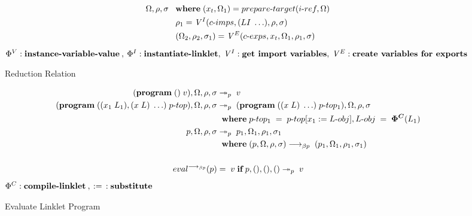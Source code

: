 \documentclass[sigplan,screen,anonymous]{acmart}
\def\dash {\text{-}}
\begin{document}
\begin{figure}[tbp]
\begin{align*}
    \Omega, \rho, \sigma\; &\;\; \where (x_t, \Omega_1) = prepare\dash target(i\dash ref, \Omega) \\
    \;          &\;\; \rho_1 = \mathit{V}^I(c\dash imps, (LI\; \ldots), \rho, \sigma) \\
    \;          &\;\; (\Omega_2, \rho_2, \sigma_1) = \mathit{V}^E(c\dash exps, x_t, \Omega_1, \rho_1, \sigma) \\
  \end{align*}
  \hfill \footnotesize $\Phi^V : \textbf{instance\dash variable\dash value}\:,\: \Phi^I : \textbf{instantiate\dash linklet},\: \mathit{V}^I : \textbf{get  import variables},\: \mathit{V}^E : \textbf{create variables for exports}$
\caption{Reduction Relation}
\label{fig:reduction}
\end{figure}

\newcommand{\runio}[1]{run\dash prog(#1, \Omega, \rho, \sigma)\;}
\newcommand{\prog}[2]{(\textbf{program}\; (\textbf{use\dash linklets}\;#1 )\;#2)}
\def\transrel {&\twoheadrightarrow_{p}\;}

\begin{figure}[tbp]
  \begin{align*}
    (\textbf{program}\; ()\;v), \Omega, \rho, \sigma \transrel v \\
    (\textbf{program}\; ((x_1\;L_1),(x\;L)\;\ldots)\;p\dash top), \Omega, \rho, \sigma \transrel (\textbf{program}\; ((x\;L)\;\ldots)\;p\dash top_1 ), \Omega, \rho, \sigma \\
    \;          &\;\; \where p\dash top_1\; =\; p\dash top[x_1 := L\dash obj], L\dash obj\;=\;\bm{\Phi^C}(L_1) \\
    p, \Omega, \rho, \sigma \transrel p_1, \Omega_1, \rho_1, \sigma_1 \\
    \;          &\;\; \where (p, \Omega, \rho, \sigma) \longrightarrow_{\beta p}\; (p_1, \Omega_1, \rho_1, \sigma_1)  \\ \\
    eval^{\longrightarrow_{\beta p}}(p) &=\; v\; \textbf{if}\; p, (), (), () \twoheadrightarrow_p\; v
  \end{align*}
  \hfill \footnotesize $\Phi^C : \textbf{compile\dash linklet}\:,\: :=\:\: : \textbf{substitute}$
\caption{Evaluate Linklet Program}
\label{fig:main}
\end{figure}
\end{document}
